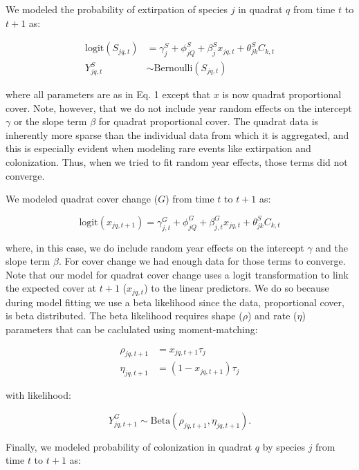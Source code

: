 \documentclass[author-year, 12pt,review]{components/elsarticle} %
\begin{document}
We modeled the probability of extirpation of species $j$ in quadrat $q$
from time $t$ to $t+1$ as:

\begin{align}
\text{logit}(S_{jq,t}) &= \gamma^{S}_{j} + \phi^{S}_{jQ} + \beta^{S}_{j}x_{jq,t} + \theta^{S}_{jk}C_{k,t} \\
Y^{S}_{jq,t} &\sim \text{Bernoulli}(S_{jq,t})
\end{align}

where all parameters are as in Eq. 1 except that $x$ is now quadrat
proportional cover. Note, however, that we do not include year random
effects on the intercept $\gamma$ or the slope term $\beta$ for quadrat
proportional cover. The quadrat data is inherently more sparse than the
individual data from which it is aggregated, and this is especially
evident when modeling rare events like extirpation and colonization.
Thus, when we tried to fit random year effects, those terms did not
converge.

We modeled quadrat cover change ($G$) from time $t$ to $t+1$ as:

\begin{equation}
\text{logit}(x_{jq,t+1}) = \gamma^{G}_{j,t} + \phi^{G}_{jQ} + \beta^{G}_{j,t}x_{jq,t} + \theta^{S}_{jk}C_{k,t}
\end{equation}

where, in this case, we do include random year effects on the intercept
$\gamma$ and the slope term $\beta$. For cover change we had enough data
for those terms to converge. Note that our model for quadrat cover
change uses a logit transformation to link the expected cover at $t+1$
($x_{jq,t}$) to the linear predictors. We do so because during model
fitting we use a beta likelihood since the data, proportional cover, is
beta distributed. The beta likelihood requires shape ($\rho$) and rate
($\eta$) parameters that can be caclulated using moment-matching:

\begin{align}
\rho_{jq,t+1} &= x_{jq,t+1}\tau_{j} \\
\eta_{jq,t+1} &= (1-x_{jq,t+1})\tau_{j}
\end{align}

with likelihood:

\begin{equation}
Y^{G}_{jq,t+1} \sim \text{Beta}(\rho_{jq,t+1}, \eta_{jq,t+1}).
\end{equation}

Finally, we modeled probability of colonization in quadrat $q$ by
species $j$ from time $t$ to $t+1$ as:
\end{document}
